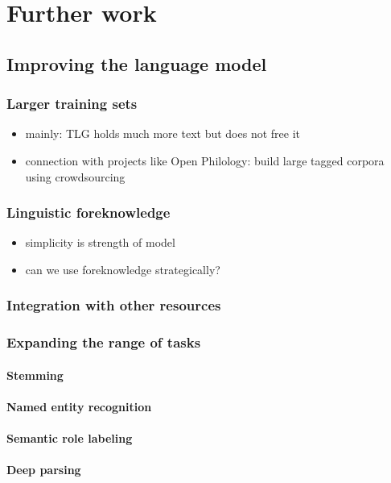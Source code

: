 \chapter{Further work} %
\label{chp:further_work} 


\section{Improving the language model}
\subsection{Larger training sets}
\begin{itemize}
\item mainly: TLG holds much more text but does not free it
\item connection with projects like Open Philology: build large tagged
corpora using crowdsourcing
\end{itemize}
\subsection{Linguistic foreknowledge}
\begin{itemize}
\item simplicity is strength of model
\item can we use foreknowledge strategically?
\end{itemize}
\subsection{Integration with other resources}
\subsection{Expanding the range of tasks}
\subsubsection{Stemming}
\subsubsection{Named entity recognition}
\subsubsection{Semantic role labeling}
\subsubsection{Deep parsing}

